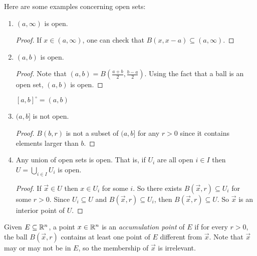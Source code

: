 \documentclass[11pt]{article}
\newcommand{\x}{\vec{x}}
\begin{document}
\begin{example}
    Here are some examples concerning open sets:
    \begin{enumerate}
        \item $(a,\infty)$ is open. \begin{proof}
            If $x \in (a, \infty)$, one can check that $B(x, x-a) \subseteq (a,\infty)$.
        \end{proof}
        \item $(a,b)$ is open. 
        \begin{proof}
            Note that $(a,b) = B(\frac{a+b}{2}, \frac{b-a}{2})$. Using the fact that a ball is an open set, $(a,b)$ is open. 
        \end{proof}
        \begin{corollary}
            $[a,b]^{\circ} = (a,b)$
        \end{corollary}
        \item $(a,b]$ is not open. 
        \begin{proof}
            $B(b,r)$ is not a subset of $(a,b]$ for any $r > 0$ since it contains elements larger than $b$. 
        \end{proof}
        \item Any union of open sets is open. That is, if $U_i$ are all open $i \in I$ then $U = \bigcup_{i \in I} U_i$ is open. 
        \begin{proof}
            If $\x \in U$ then $x \in U_i$ for some $i$. So there exists $B(\x, r) \subseteq U_i$ for some $r > 0$. Since $U_i \subseteq U$ and $B(\x,r) \subseteq U_i$, then $B(\x,r) \subseteq U$. So $\x$ is an interior point of $U$. 
        \end{proof}
    \end{enumerate}
\end{example}

\begin{definition}
    Given $E \subseteq \mathbb{R}^n$, a point $x \in \mathbb{R}^n$ is an \textit{accumulation point} of $E$ if for every $r > 0$, the ball $B(\x,r)$ contains at least one point of $E$ different from $\x$. Note that $\x$ may or may not be in $E$, so the membership of $\x$ is irrelevant.
\end{definition}
\end{document}

